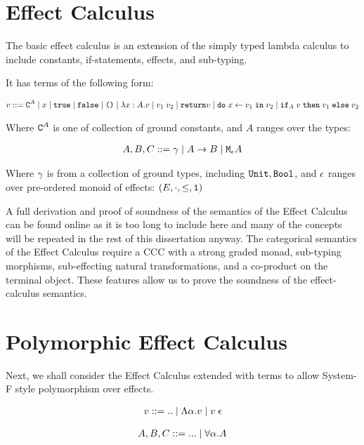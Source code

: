 \documentclass{Report}
\begin{document}
\section{Effect Calculus}
The basic effect calculus is an extension of the simply typed lambda calculus to include constants, if-statements, effects, and sub-typing.

It has terms of the following form:

\begin{align}
    v ::= \texttt{C}^{A} \mid x\mid \texttt{true} \mid\texttt{false} \mid\texttt{()}\mid\lambda x : A. v\mid v_1\; v_2\mid\texttt{return} v\mid\texttt{do}\; x \leftarrow v_1 \;\texttt{in}\; v_2\mid\texttt{if}_{A}\; v\; \texttt{then}\; v_1 \;\texttt{else} \; v_2 
\end{align}

Where $\texttt{C}^{A}$ is one of collection of ground constants, and $A$ ranges over the types:

\begin{align}
    A, B, C ::= \gamma\mid A\rightarrow B \mid\texttt{M}_{\epsilon}{A}
\end{align}

Where $\gamma$ is from a collection of ground types, including $\texttt{Unit}, \texttt{Bool}$, and $\epsilon$ ranges over pre-ordered monoid of effects: $(E, \cdot, \leq, \texttt{1})$


A full derivation and proof of soundness of the semantics of the Effect Calculus can be found online  as it is too long to include here and many of the concepts will be repeated in the rest of this dissertation anyway. The categorical semantics of the Effect Calculus require a CCC with a strong graded monad, sub-typing morphisms, sub-effecting natural transformations, and a co-product on the terminal object. These features allow us to prove the soundness of the effect-calculus semantics.

\section{Polymorphic Effect Calculus}
Next, we shall consider the Effect Calculus extended with terms to allow System-F style polymorphism over effects.

\begin{align}
    v::=\text{..}\mid\Lambda \alpha. v\mid v\;\epsilon
\end{align}

\begin{align}
    A, B, C::=\text{...}\mid \forall \alpha. A
\end{align}
\end{document}
